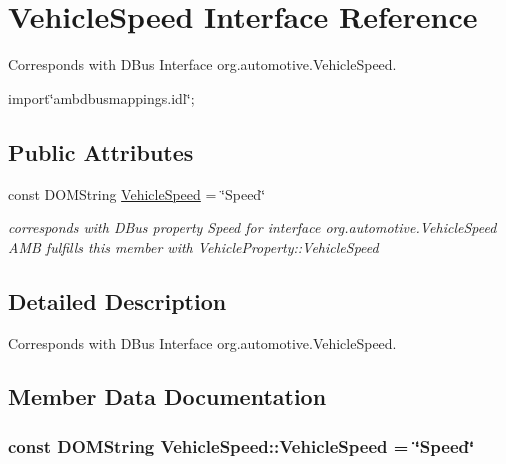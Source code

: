 \hypertarget{interfaceVehicleSpeed}{\section{Vehicle\+Speed Interface Reference}
\label{interfaceVehicleSpeed}
}


Corresponds with D\+Bus Interface org.\+automotive.\+Vehicle\+Speed.  




{\ttfamily import\char`\"{}ambdbusmappings.\+idl\char`\"{};}

\subsection*{Public Attributes}
\begin{DoxyCompactItemize}
\item 
const D\+O\+M\+String \hyperlink{interfaceVehicleSpeed_a414d86d8a52df7495cf6b462f89beded}{Vehicle\+Speed} = \char`\"{}Speed\char`\"{}
\begin{DoxyCompactList}\small\item\em corresponds with D\+Bus property Speed for interface org.\+automotive.\+Vehicle\+Speed A\+M\+B fulfills this member with Vehicle\+Property\+::\+Vehicle\+Speed \end{DoxyCompactList}\end{DoxyCompactItemize}


\subsection{Detailed Description}
Corresponds with D\+Bus Interface org.\+automotive.\+Vehicle\+Speed. 

\subsection{Member Data Documentation}
\hypertarget{interfaceVehicleSpeed_a414d86d8a52df7495cf6b462f89beded}{
\subsubsection[{Vehicle\+Speed}]{\setlength{\rightskip}{0pt plus 5cm}const D\+O\+M\+String Vehicle\+Speed\+::\+Vehicle\+Speed = \char`\"{}Speed\char`\"{}}}\label{interfaceVehicleSpeed_a414d86d8a52df7495cf6b462f89beded}


